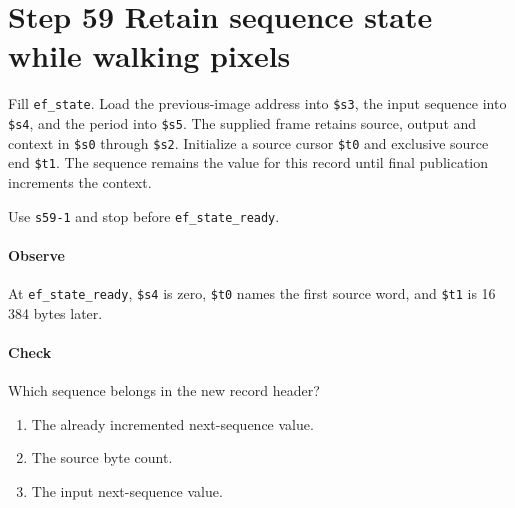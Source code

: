 \section{Step 59 Retain sequence state while walking pixels}
Fill \texttt{ef\_state}. Load the previous-image address into \texttt{\$s3}, the input sequence into \texttt{\$s4}, and the period into \texttt{\$s5}. The supplied frame retains source, output and context in \texttt{\$s0} through \texttt{\$s2}. Initialize a source cursor \texttt{\$t0} and exclusive source end \texttt{\$t1}. The sequence remains the value for this record until final publication increments the context.

Use \texttt{s59-1} and stop before \texttt{ef\_state\_ready}.

\paragraph{Observe} At \texttt{ef\_state\_ready}, \texttt{\$s4} is zero, \texttt{\$t0} names the first source word, and \texttt{\$t1} is 16\,384 bytes later.

\paragraph{Check} Which sequence belongs in the new record header?
\begin{enumerate}[label=\Alph*.]
  \item The already incremented next-sequence value.
  \item The source byte count.
  \item The input next-sequence value.
\end{enumerate}
